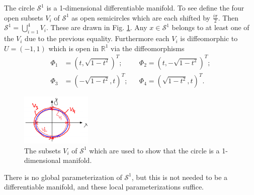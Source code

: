 \begin{ex}
	The circle $\mathcal{S}^{1}$ is a 1-dimensional differentiable manifold. To see define the four open subsets $V_i$ of $\mathcal{S}^{1}$ as open semicircles which are each shifted by $\frac{i \pi }{2} $. Then $\mathcal{S}^{1} = \bigcup_{i=1}^{4}V_i$. These are drawn in Fig. \ref{fig:s1_subsets}. Any $x\in \mathcal{S}^{1}$ belongs to at least one of the $V_i$ due to the previous equality. Furthermore each $V_i$ is diffeomorphic to $U=(-1,1)$ which is open in $\mathbb{R}^{1}$ via the diffeomorphisms
	\begin{subequations}
		\begin{align}
		\Phi_1 &= (t, \sqrt{1-t^2})^{T};&&\Phi_2 = (t, -\sqrt{1-t^2})^{T}; \\
		\Phi_3 &= (-\sqrt{1-t^2}, t)^{T};&&\Phi_4 = (\sqrt{1-t^2}, t)^{T}.
		\end{align}
	\end{subequations}
\begin{figure}[h!]
	\centering
	\includegraphics[width=0.3\textwidth]{figures/ch9/3s1_subsets.png}
	\caption{The subsets $V_i$ of $\mathcal{S}^{1} $ which are used to show that the circle is a 1-dimensional manifold.}
	\label{fig:s1_subsets}
\end{figure}

There is no global parameterization of $\mathcal{S}^{1}$, but this is not needed to be a differentiable manifold, and these local parameterizations suffice.	
\end{ex}


